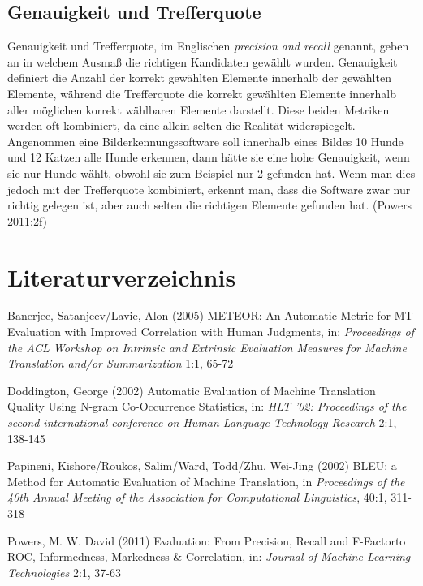 \documentclass[12pt]{article}
\begin{document}
	\subsection{Genauigkeit und Trefferquote}
	Genauigkeit und Trefferquote, im Englischen \textit{precision and recall} genannt, geben an in welchem Ausmaß die richtigen Kandidaten gewählt wurden. Genauigkeit definiert die Anzahl der korrekt gewählten Elemente innerhalb der gewählten Elemente, während die Trefferquote die korrekt gewählten Elemente innerhalb aller möglichen korrekt wählbaren Elemente darstellt. Diese beiden Metriken werden oft kombiniert, da eine allein selten die Realität widerspiegelt. Angenommen eine Bilderkennungssoftware soll innerhalb eines Bildes 10 Hunde und 12 Katzen alle Hunde erkennen, dann hätte sie eine hohe Genauigkeit, wenn sie nur Hunde wählt, obwohl sie zum Beispiel nur 2 gefunden hat. Wenn man dies jedoch mit der Trefferquote kombiniert, erkennt man, dass die Software zwar nur richtig gelegen ist, aber auch selten die richtigen Elemente gefunden hat. (Powers 2011:2f)

	\newpage
	\section*{Literaturverzeichnis}
	\begin{hangparas}{.25in}{1}
	Banerjee, Satanjeev/Lavie, Alon (2005) \glqq METEOR: An Automatic Metric for MT Evaluation with Improved Correlation with Human Judgments\grqq, in: \textit{Proceedings of the ACL Workshop on Intrinsic and Extrinsic Evaluation Measures for Machine Translation and/or Summarization} 1:1, 65-72 \\
	\end{hangparas}
	\begin{hangparas}{.25in}{1}
	Doddington, George (2002) \glqq Automatic Evaluation of Machine Translation Quality Using N-gram Co-Occurrence Statistics\grqq, in: \textit{HLT '02: Proceedings of the second international conference on Human Language Technology Research} 2:1, 138-145 \\
	\end{hangparas}
	\begin{hangparas}{.25in}{1}
	Papineni, Kishore/Roukos, Salim/Ward, Todd/Zhu, Wei-Jing (2002) \glqq BLEU: a Method for Automatic Evaluation of Machine Translation\grqq, in \textit{Proceedings of the 40th Annual Meeting of the Association for Computational Linguistics}, 40:1, 311-318 \\
	\end{hangparas}
	\begin{hangparas}{.25in}{1}
	Powers, M. W. David (2011) \glqq Evaluation: From Precision, Recall and F-Factorto ROC, Informedness, Markedness \& Correlation\grqq, in: \textit{Journal of Machine Learning Technologies} 2:1, 37-63
	\end{hangparas}
	
	
\end{document}
